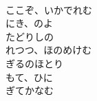 \documentclass[10pt,b5j]{tarticle} %
\begin{document}
\begin{enumerate}
\begin{minipage}[c]{\blocksize}
    \end{minipage}
    \begin{minipage}[c]{\blocksize}
        
        \vspace{\linespace}
        \item~\\
        ここぞ、いかでれむ\\
        にき、のよ\\
        たどりしの\\
        れつつ、ほのめけむ\\
        ぎるのほとり\\
        もて、ひに\\
        ぎてかなむ
    
    \end{minipage}
\end{enumerate} %
\end{document}
